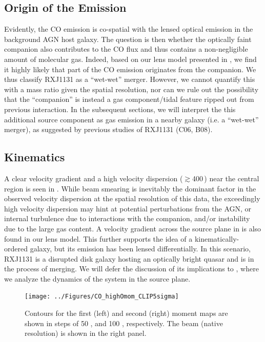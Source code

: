 \documentclass[]{emulateapj}
\begin{document}
\subsection{Origin of the \bco Emission} \label{sec:origin} %
Evidently, the CO emission is co-spatial with the lensed optical emission in
the background AGN host galaxy.
The question is then whether the optically
faint companion also contributes to the CO flux and thus contains a
non-negligible amount of molecular gas.
Indeed, based on our lens model presented in , we find it
highly likely that part of the CO emission originates from
the companion. We thus classify RXJ1131 as a ``wet-wet'' merger.
However, we cannot quantify this with a mass ratio given the
spatial resolution, nor can we rule out the possibility that
the ``companion'' is instead a gas component/tidal feature ripped out
from previous interaction.
In the subsequent sections, we will interpret
the this additional source component as gas emission
in a nearby galaxy (i.e. a ``wet-wet'' merger), as suggested by previous studies of RXJ1131 (C06, B08).

\subsection{\bco Kinematics} %
A clear velocity gradient and a high
velocity dispersion ($\gtrsim$400\,\kms) near the central region
is seen in . While beam smearing is inevitably the
dominant factor in the observed velocity dispersion
at the spatial resolution of this data, the exceedingly
high velocity dispersion may hint
at potential perturbations from the AGN, or internal turbulence due to
interactions with the companion, and/or instability due to the large gas
content. A velocity gradient across the source plane in  is also
found in our lens model. This further supports the idea of a
kinematically-ordered galaxy, but its emission has been lensed differentially.
In this scenario, RXJ1131 is a disrupted disk galaxy hosting an optically
bright quasar and is in the process of merging.
We will defer the discussion of its implications to ,
where we analyze the dynamics of the system in the source plane.

\begin{figure}[!htbp]
\centering
\texttt{[image: ../Figures/CO\_highOmom\_CLIP5sigma]}
\caption{
Contours for the first (left) and second (right) moment maps are shown in steps of
50 \kms, and 100 \kms, respectively. The beam (native resolution) is shown in the right panel.
\label{fig:CO21highO}}
\end{figure}
\end{document}
